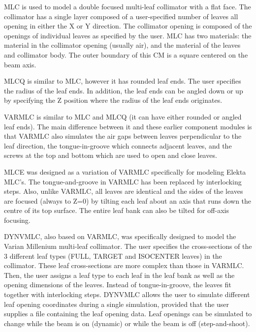 \documentclass[12pt,twoside]{article}
\begin{document}
MLC is used to model a double focused multi-leaf collimator with a flat face.
The collimator has a single
layer composed of a user-specified number of leaves all opening in
either the X or Y direction.  The collimator opening is composed of
the openings of individual leaves as specified by the user.
MLC has two materials: the material in the collimator opening
(usually air), and the material of the leaves and collimator body.  The outer
boundary of this CM is a square centered on the beam axis.

MLCQ is similar to MLC, however it has rounded leaf ends.
The user specifies the radius of the leaf ends.  In addition, the
leaf ends can be angled down or up by specifying the Z position where the
radius of the leaf ends originates.

VARMLC is similar to MLC and MLCQ (it can have either rounded or angled
leaf ends).  The main difference between it and these earlier component
modules is that VARMLC also simulates the air gaps between leaves perpendicular
to the leaf direction, the tongue-in-groove which connects adjacent leaves, and
the screws at the top and bottom which are used to open and close leaves.

MLCE was designed as a variation of VARMLC specifically for modeling
Elekta MLC's.  The tongue-and-groove in VARMLC has been replaced by
interlocking steps.  Also, unlike VARMLC, all leaves are identical and
the sides of the leaves are focused (always to Z=0)
by tilting each leaf about an axis that runs down the centre of its top
surface.  The entire leaf bank can also be tilted for off-axis focusing.

DYNVMLC, also based on VARMLC, was specifically designed to model
the Varian Millenium multi-leaf collimator.  The user specifies the
cross-sections of the 3 different leaf types (FULL, TARGET and ISOCENTER
leaves) in the collimator.  These leaf cross-sections are more complex than those
in VARMLC.  Then, the user assigns a leaf type to each leaf in the leaf bank as
well as the opening dimensions of the leaves.  Instead of tongue-in-groove, the
leaves fit together with interlocking steps.  DYNVMLC allows the user to simulate
different leaf opening coordinates during a single simulation, provided that the user
supplies a file containing the leaf opening data.  Leaf openings can be simulated to
change while the beam is on (dynamic) or while the beam is off (step-and-shoot).
\end{document}
